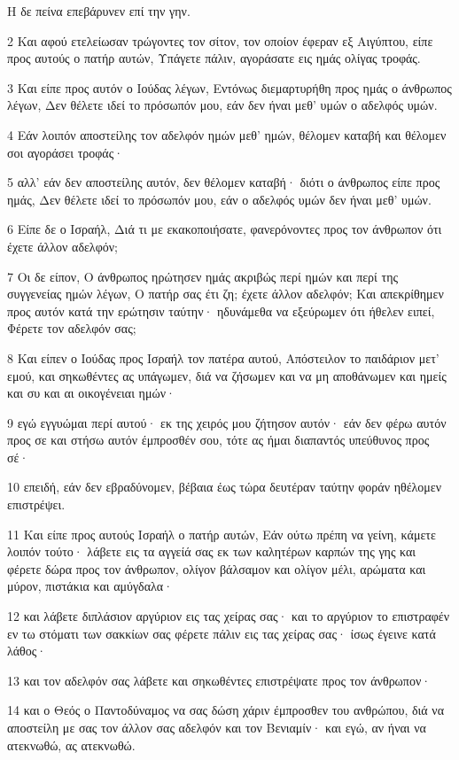 \par Η δε πείνα επεβάρυνεν επί την γην.
\par 2 Και αφού ετελείωσαν τρώγοντες τον σίτον, τον οποίον έφεραν εξ Αιγύπτου, είπε προς αυτούς ο πατήρ αυτών, Υπάγετε πάλιν, αγοράσατε εις ημάς ολίγας τροφάς.
\par 3 Και είπε προς αυτόν ο Ιούδας λέγων, Εντόνως διεμαρτυρήθη προς ημάς ο άνθρωπος λέγων, Δεν θέλετε ιδεί το πρόσωπόν μου, εάν δεν ήναι μεθ' υμών ο αδελφός υμών.
\par 4 Εάν λοιπόν αποστείλης τον αδελφόν ημών μεθ' ημών, θέλομεν καταβή και θέλομεν σοι αγοράσει τροφάς·
\par 5 αλλ' εάν δεν αποστείλης αυτόν, δεν θέλομεν καταβή· διότι ο άνθρωπος είπε προς ημάς, Δεν θέλετε ιδεί το πρόσωπόν μου, εάν ο αδελφός υμών δεν ήναι μεθ' υμών.
\par 6 Είπε δε ο Ισραήλ, Διά τι με εκακοποιήσατε, φανερόνοντες προς τον άνθρωπον ότι έχετε άλλον αδελφόν;
\par 7 Οι δε είπον, Ο άνθρωπος ηρώτησεν ημάς ακριβώς περί ημών και περί της συγγενείας ημών λέγων, Ο πατήρ σας έτι ζη; έχετε άλλον αδελφόν; Και απεκρίθημεν προς αυτόν κατά την ερώτησιν ταύτην· ηδυνάμεθα να εξεύρωμεν ότι ήθελεν ειπεί, Φέρετε τον αδελφόν σας;
\par 8 Και είπεν ο Ιούδας προς Ισραήλ τον πατέρα αυτού, Απόστειλον το παιδάριον μετ' εμού, και σηκωθέντες ας υπάγωμεν, διά να ζήσωμεν και να μη αποθάνωμεν και ημείς και συ και αι οικογένειαι ημών·
\par 9 εγώ εγγυώμαι περί αυτού· εκ της χειρός μου ζήτησον αυτόν· εάν δεν φέρω αυτόν προς σε και στήσω αυτόν έμπροσθέν σου, τότε ας ήμαι διαπαντός υπεύθυνος προς σέ·
\par 10 επειδή, εάν δεν εβραδύνομεν, βέβαια έως τώρα δευτέραν ταύτην φοράν ηθέλομεν επιστρέψει.
\par 11 Και είπε προς αυτούς Ισραήλ ο πατήρ αυτών, Εάν ούτω πρέπη να γείνη, κάμετε λοιπόν τούτο· λάβετε εις τα αγγείά σας εκ των καλητέρων καρπών της γης και φέρετε δώρα προς τον άνθρωπον, ολίγον βάλσαμον και ολίγον μέλι, αρώματα και μύρον, πιστάκια και αμύγδαλα·
\par 12 και λάβετε διπλάσιον αργύριον εις τας χείρας σας· και το αργύριον το επιστραφέν εν τω στόματι των σακκίων σας φέρετε πάλιν εις τας χείρας σας· ίσως έγεινε κατά λάθος·
\par 13 και τον αδελφόν σας λάβετε και σηκωθέντες επιστρέψατε προς τον άνθρωπον·
\par 14 και ο Θεός ο Παντοδύναμος να σας δώση χάριν έμπροσθεν του ανθρώπου, διά να αποστείλη με σας τον άλλον σας αδελφόν και τον Βενιαμίν· και εγώ, αν ήναι να ατεκνωθώ, ας ατεκνωθώ.
